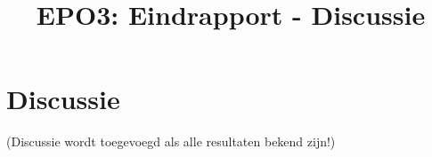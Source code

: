 \documentclass{scrartcl} %
\author{}
\title{EPO3: Eindrapport - Discussie}
\begin{document}
\chapter{Discussie}
\label{ch:discussie}

(Discussie wordt toegevoegd als alle resultaten bekend zijn!)
\end{document}
